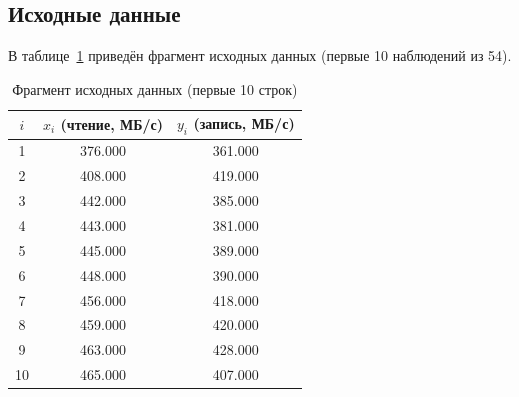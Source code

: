 \subsection{Исходные данные}

В таблице~\ref{tab:data_sample} приведён фрагмент исходных данных (первые 10 наблюдений из 54).

\begin{table}[H]
\centering
\caption{Фрагмент исходных данных (первые 10 строк)}
\label{tab:data_sample}
\begin{tabular}{ccc}
\toprule
\(i\) & \(x_i\) (чтение, МБ/с) & \(y_i\) (запись, МБ/с) \\
\midrule
1 & 376.000 & 361.000 \\
2 & 408.000 & 419.000 \\
3 & 442.000 & 385.000 \\
4 & 443.000 & 381.000 \\
5 & 445.000 & 389.000 \\
6 & 448.000 & 390.000 \\
7 & 456.000 & 418.000 \\
8 & 459.000 & 420.000 \\
9 & 463.000 & 428.000 \\
10 & 465.000 & 407.000 \\
\bottomrule
\end{tabular}
\end{table}
